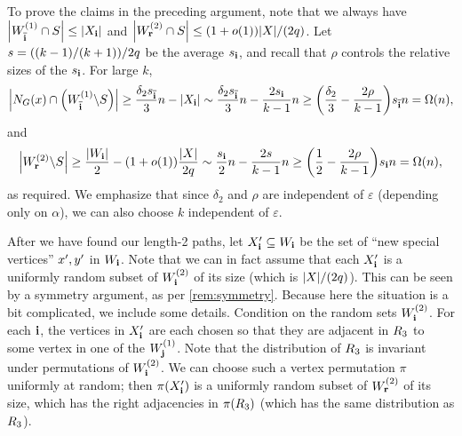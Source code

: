 \documentclass[11pt,english]{article}
\theoremstyle{plain}
\theoremstyle{plain}
\theoremstyle{plain}
\theoremstyle{plain}
\theoremstyle{plain}
\theoremstyle{definition}
\theoremstyle{definition}
\theoremstyle{remark}
\theoremstyle{remark}
\theoremstyle{plain}
\theoremstyle{definition}
\theoremstyle{definition}
\theoremstyle{plain}
\theoremstyle{plain}
\theoremstyle{plain}
\theoremstyle{plain}
\theoremstyle{remark}
\theoremstyle{plain}
\theoremstyle{definition}
\let\originalleft\left
\let\originalright\right
\renewcommand{\left}{\mathopen{}\mathclose\bgroup\originalleft}
\renewcommand{\right}{\aftergroup\egroup\originalright}
\begin{document}
To prove the claims in the preceding argument, note that we always
have $\left|W_{\flip{\bi}}^{\left(1\right)}\cap S\right|\le\left|X_{\bi}\right|$
and $\left|W_{\br}^{\left(2\right)}\cap S\right|\le\left(1+o\left(1\right)\right)\left|X\right|/\left(2q\right)$.
Let $s=\left(\left(k-1\right)/\left(k+1\right)\right)/2q$ be the
average $s_{\mathbf{i}}$, and recall that $\rho$ controls the relative
sizes of the $s_{\mathbf{i}}$. For large $k$,
\[
\left|N_{\G}\left(\x\right)\cap\left(W_{\flip{\bi}}^{\left(1\right)}\backslash S\right)\right|\ge\frac{\delta_{2}s_{\flip{\bi}}}{3}n-\left|X_{\bi}\right|\sim\frac{\delta_{2}s_{\flip{\bi}}}{3}n-\frac{2s_{\bi}}{k-1}n\ge\left(\frac{\delta_{2}}{3}-\frac{2\rho}{k-1}\right)s_{\flip{\bi}}n=\Omega\left(n\right),
\]
and
\[
\left|W_{\br}^{\left(2\right)}\backslash S\right|\ge\frac{\left|W_{\bi}\right|}{2}-\left(1+o\left(1\right)\right)\frac{\left|X\right|}{2q}\sim\frac{s_{\bi}}{2}n-\frac{2s}{k-1}n\ge\left(\frac{1}{2}-\frac{2\rho}{k-1}\right)s_{\bi}n=\Omega\left(n\right),
\]
as required. We emphasize that since $\delta_{2}$ and $\rho$ are
independent of $\varepsilon$ (depending only on $\alpha$), we can
also choose $k$ independent of $\varepsilon$.

After we have found our length-2 paths, let $X_{\mathbf{i}}'\subseteq W_{\mathbf{i}}$
be the set of ``new special vertices'' $x',y'$ in $W_{\mathbf{i}}$.
Note that we can in fact assume that each $X_{\mathbf{i}}'$ is a uniformly
random subset of $W_{\bi}^{\left(2\right)}$ of its size (which is
$\left|X\right|/\left(2q\right)$). This can be seen by a symmetry
argument, as per \ref{rem:symmetry}. Because here the situation is
a bit complicated, we include some details. Condition on the random
sets $W_{\bi}^{\left(2\right)}$. For each $\mathbf{i}$, the vertices in
$X_{\mathbf{i}}'$ are each chosen so that they are adjacent in $R_{3}$
to some vertex in one of the $W_{\bj}^{\left(1\right)}$. Note that
the distribution of $R_{3}$ is invariant under permutations of $W_{\bi}^{\left(2\right)}$.
We can choose such a vertex permutation $\pi$ uniformly at random;
then $\pi\left(X_{\bi}'\right)$ is a uniformly random subset of $W_{\br}^{\left(2\right)}$
of its size, which has the right adjacencies in $\pi\left(\R_{3}\right)$
(which has the same distribution as $R_{3}$).
\end{document}
